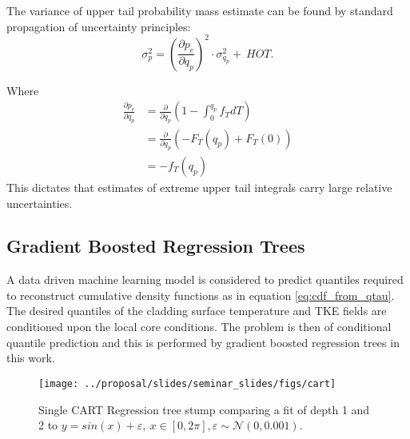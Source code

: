     The variance of upper tail probability mass estimate can be found by standard propagation of uncertainty principles:
   \begin{equation}
    \sigma_p^2 = \left(\frac{\partial p_e}{\partial q_p} \right)^2 \cdot \sigma_{q_p}^2 +\  HOT.
    \label{eq:pr_thresh_uncert}
    \end{equation}

    Where
   \begin{eqnarray}
    \frac{\partial p_e}{\partial q_p} &= \frac{\partial}{\partial q_p} \left( 1 - \int_0^{q_p} f_T dT \right) \nonumber \\
    &= \frac{\partial}{\partial q_p} \left( -F_T(q_p) + F_T(0) \right) \nonumber \\
    &= -f_T(q_p)
    \end{eqnarray}
    This dictates that estimates of extreme upper tail integrals carry large relative uncertainties.



\subsection{Gradient Boosted Regression Trees}
\label{chap:GBRT}

A data driven machine learning model is considered to predict quantiles required to reconstruct cumulative density functions as in equation \ref{eq:cdf_from_qtau}.  The desired quantiles of the cladding surface temperature and TKE fields are conditioned upon the local core conditions.  The problem is then of conditional quantile prediction and this is performed by gradient boosted regression trees in this work.

\begin{figure}[H]
    \centering
    \texttt{[image: ../proposal/slides/seminar\_slides/figs/cart]}
    \caption[Regression tree stump.]{Single CART Regression tree stump comparing a fit of depth 1 and 2 to $y=sin(x) + \varepsilon,\ x\in[0,2\pi], \varepsilon \sim \mathcal N(0,0.001)$.}
    \label{fig:cart}
\end{figure}

